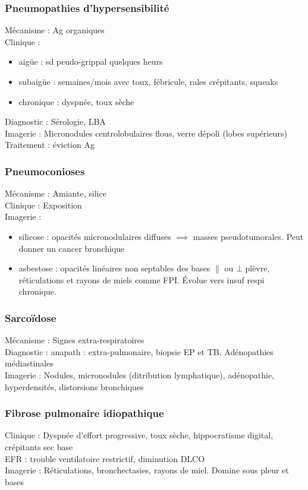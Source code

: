 \documentclass{article}
\begin{document}
\subsubsection{Pneumopathies d'hypersensibilité}
Mécanisme : Ag organiques\\
Clinique : 
\begin{itemize}
\item aigüe : sd peudo-grippal quelques heurs
\item subaigüe : semaines/mois avec toux, fébricule, rales crépitants, squeaks
\item chronique : dyspnée, toux sèche
\end{itemize}
Diagnostic : Sérologie, LBA\\
Imagerie : Micronodules centrolobulaires flous, verre dépoli (lobes supérieurs)\\
Traitement : éviction Ag

\subsubsection{Pneumoconioses}
Mécanisme : Amiante, silice\\
Clinique : Exposition\\
Imagerie : 
\begin{itemize}
\item silicose : opacités micronodulaires diffuses \(\implies\) masses pseudotumorales. Peut donner un cancer bronchique
\item asbestose : opacités linéaires non septables des bases \(\parallel\) ou \(\bot\) plèvre, réticulations et rayons de miels comme FPI. Évolue vers insuf respi chronique.
\end{itemize}

\subsubsection{Sarcoïdose}
Mécanisme : Signes extra-respiratoires\\
Diagnostic : anapath : extra-pulmonaire, biopsie EP et TB. Adénopathies médiastinales \\
Imagerie : Nodules, micronodules (ditribution lymphatique), adénopathie, hyperdensités, distorsions bronchiques

\subsubsection{Fibrose pulmonaire idiopathique}
Clinique : Dyspnée d'effort progressive, toux sèche, hippocratisme digital, crépitants sec base\\
EFR : trouble ventilatoire restrictif, diminution DLCO\\
Imagerie : Réticulations, bronchectasies, rayons de miel. Domine sous pleur et bases
\end{document}
